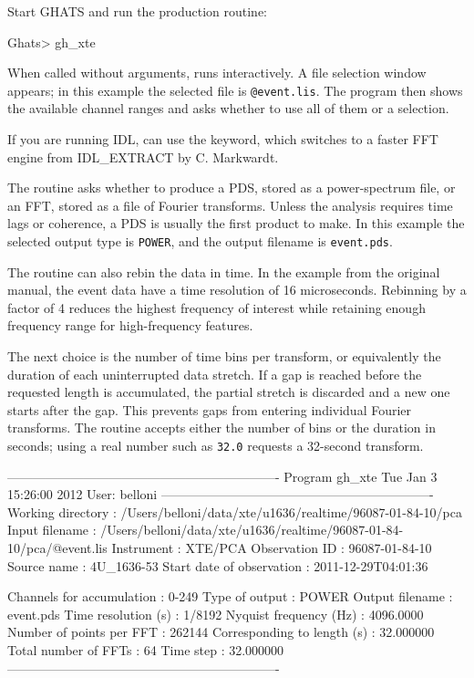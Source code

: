 Start GHATS and run the production routine:

\begin{ghatsconsole}
Ghats> gh_xte
\end{ghatsconsole}

When called without arguments,  runs interactively. A file
selection window appears; in this example the selected file is
\texttt{@event.lis}. The program then shows the available channel ranges and
asks whether to use all of them or a selection.

\begin{ghatsnote}
If you are running IDL,  can use the  keyword,
which switches to a faster FFT engine from IDL\_EXTRACT by C. Markwardt.
\end{ghatsnote}

The routine asks whether to produce a PDS, stored as a power-spectrum file, or
an FFT, stored as a file of Fourier transforms. Unless the analysis requires
time lags or coherence, a PDS is usually the first product to make. In this
example the selected output type is \texttt{POWER}, and the output filename is
\texttt{event.pds}.

The routine can also rebin the data in time. In the example from the original
manual, the event data have a time resolution of 16 microseconds. Rebinning by
a factor of 4 reduces the highest frequency of interest while retaining enough
frequency range for high-frequency features.

The next choice is the number of time bins per transform, or equivalently the
duration of each uninterrupted data stretch. If a gap is reached before the
requested length is accumulated, the partial stretch is discarded and a new one
starts after the gap. This prevents gaps from entering individual Fourier
transforms. The routine accepts either the number of bins or the duration in
seconds; using a real number such as \texttt{32.0} requests a 32-second
transform.

\begin{ghatsconsole}
----------------------------------------------------------------
Program gh_xte     Tue Jan 3 15:26:00 2012     User: belloni
----------------------------------------------------------------
Working directory               :
/Users/belloni/data/xte/u1636/realtime/96087-01-84-10/pca
Input filename                  :
/Users/belloni/data/xte/u1636/realtime/96087-01-84-10/pca/@event.lis
Instrument                      : XTE/PCA
Observation ID                  : 96087-01-84-10
Source name                     : 4U_1636-53
Start date of observation       : 2011-12-29T04:01:36

Channels for accumulation       :    0-249
Type of output                  :    POWER
Output filename                 :    event.pds
Time resolution (s)             :    1/8192
Nyquist frequency (Hz)          :    4096.0000
Number of points per FFT        :    262144
Corresponding to length (s)     :    32.000000
Total number of FFTs            :    64
Time step                       :    32.000000
----------------------------------------------------------------
\end{ghatsconsole}

